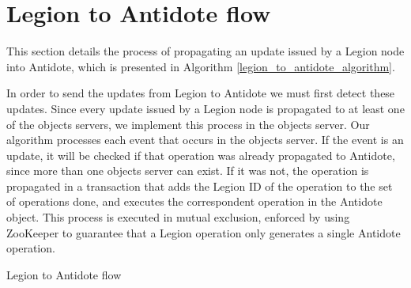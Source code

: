 \section{Legion to Antidote flow}
\label{sec:legion_to_antidote_flow}
This section details the process of propagating an update issued by a Legion node into Antidote, which is presented in Algorithm \ref{legion_to_antidote_algorithm}.\par
	In order to send the updates from Legion to Antidote we must first detect these updates. Since every update issued by a Legion node is propagated to at least one of the objects servers, we implement this process in the objects server. Our algorithm processes each event that occurs in the objects server. If the event is an update, it will be checked if that operation was already propagated to Antidote, since more than one objects server can exist. If it was not, the operation is propagated in a transaction that adds the Legion ID of the operation to the set of operations done, and executes the correspondent operation in the Antidote object. This process is executed in mutual exclusion, enforced by using ZooKeeper to guarantee that a Legion operation only generates a single Antidote operation.
	
\begin{algorithm}[H]
\caption{Legion to Antidote flow}
\label{legion_to_antidote_algorithm}
\begin{algorithmic}[1]
    \EndIf
  \EndIf
\End
\end{algorithmic}
\end{algorithm}

